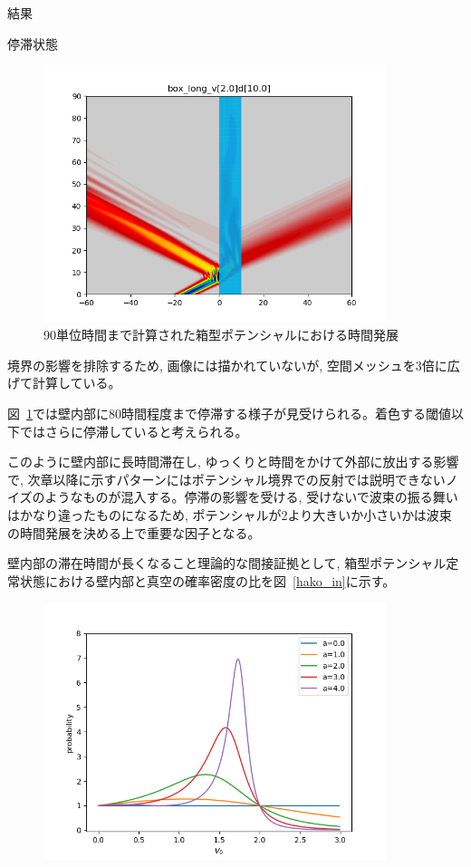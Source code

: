 \documentclass[a4paper, lualatex]{bxjsarticle}
\newcommand{\fref}[1]{図~\ref{#1}}
\begin{document}
\begin{section}{結果}
\begin{subsection}{停滞状態\label{teitais}}
        \begin{figure}[h]
            \centering
            \includegraphics[width=10cm]{hako_long.png}
            \caption{90単位時間まで計算された箱型ポテンシャルにおける時間発展}
            \label{hako_long}
        \end{figure}
        \par 境界の影響を排除するため, 画像には描かれていないが, 空間メッシュを3倍に広げて計算している。
        \par \fref{hako_long}では壁内部に80時間程度まで停滞する様子が見受けられる。着色する閾値以下ではさらに停滞していると考えられる。
        \par このように壁内部に長時間滞在し, ゆっくりと時間をかけて外部に放出する影響で, 次章以降に示すパターンにはポテンシャル境界での反射では説明できないノイズのようなものが混入する。停滞の影響を受ける, 受けないで波束の振る舞いはかなり違ったものになるため, ポテンシャルが2より大きいか小さいかは波束の時間発展を決める上で重要な因子となる。
        \par 壁内部の滞在時間が長くなること理論的な間接証拠として, 箱型ポテンシャル定常状態における壁内部と真空の確率密度の比を\fref{hako_in}に示す。
         \begin{figure}[h]
            \centering
            \includegraphics[width=10cm]{hako_in.png}

\end{figure}
\end{subsection}
\end{section}
\end{document}
